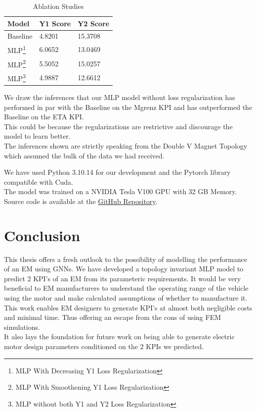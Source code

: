 \documentclass{report} %
\begin{document}
\begin{minipage}[t]{\textwidth}
    \begin{table}[H]
        \centering
        \begin{tabular}{|l|l|l|}
        \hline {\bf Model} & {\bf Y1 Score} & {\bf Y2 Score}\\
        \hline 
        Baseline & 4.8201 & 15.3708 \\
        MLP\footnote{\centering MLP With Decreasing Y1 Loss Regularization} & 6.0652 & 13.0469 \\
        MLP\footnote{\centering MLP With Smoothening Y1 Loss Regularization} & 5.5052 & 15.0257 \\
        MLP\footnote{\centering MLP without both Y1 and Y2 Loss Regularization} & 4.9887 & 12.6612  \\
        \hline
        \end{tabular}
        \caption{Ablation Studies}
        \label{tab:Ablation Studies}
    \end{table}
\end{minipage}

\vspace{1em} %

We draw the inferences that our \ac{MLP} model without loss regularization has performed in par with the Baseline on the Mgrenz \ac{KPI} and has outperformed the Baseline on the ETA \ac{KPI}.\\
This could be because the regularizations are restrictive and discourage the model to learn better.\\
The inferences shown are strictly speaking from the Double V Magnet Topology which assumed the bulk of the data we had received.

We have used Python 3.10.14 for our development and the Pytorch library compatible with Cuda.\\
The model was trained on a NVIDIA Tesla V100 \ac{GPU} with 32 GB Memory.\\
Source code is available at the \href{https://github.com/Lilly-25/Masters-Thesis}{GitHub Repository}.

\newpage 

\chapter{Conclusion}

This thesis offers a fresh outlook to the possibility of modelling the performance of an \ac{EM} using \ac{GNN}s.
We have developed a topology invariant \ac{MLP} model to predict 2 \ac{KPI}'s of an \ac{EM} from its parameteric requirements. 
It would be very beneficial to \ac{EM} manufacturers to understand the operating range of the vehicle using the motor and make calculated assumptions of whether to manufacture it.\\
This work enables \ac{EM} designers to generate \ac{KPI}'s at almost both negligible costs and minimal time.
Thus offering an escape from the cons of using \ac{FEM} simulations.\\
It also lays the foundation for future work on being able to generate electric motor design parameters conditioned on the 2 KPIs we predicted.
\end{document}

